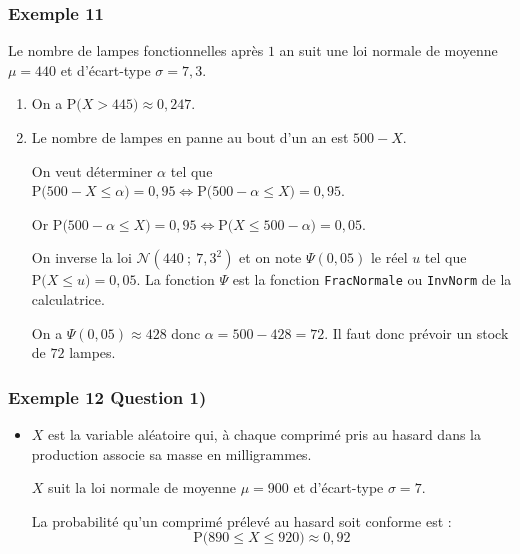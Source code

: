\documentclass[xcolor=svgnames,t,final]{beamer}
\newcommand{\loinorm}[2]{\mathcal{N}\left(#1\ ; \ #2 \right)}
\newcommand{\proba}[1]{\text{P}\big(#1\big)}
\begin{document}
\begin{frame}

\frametitle{Exemple 11}

\label{exemple11}
Le nombre de lampes fonctionnelles après $1$ an suit une loi normale de moyenne $\mu=440$ et d'écart-type  $\sigma = 7,3$.

\begin{enumerate}
\item  On a $\proba{X>445} \approx 0,247$.

\item Le nombre de lampes en panne au bout d'un an est $500 - X$.

On veut déterminer  $\alpha$ tel que $\proba{500 - X \leqslant \alpha} = 0,95 \Leftrightarrow \proba{500 - \alpha \leqslant X} = 0,95  $. 

Or $\proba{500 - \alpha \leqslant X} = 0,95 \Leftrightarrow \proba{X \leqslant 500 - \alpha} = 0,05$.

On inverse la loi $\loinorm{440}{7,3^2}$ et on note $\Psi(0,05)$ le réel $u$ tel que $\proba{X \leqslant u} = 0,05$.
La fonction $\Psi$ est la fonction \texttt{FracNormale} ou \texttt{InvNorm} de la calculatrice.

On a $\Psi(0,05) \approx 428$ donc $\alpha = 500 - 428 = 72$. Il faut donc prévoir un stock de $72$ lampes.

\end{enumerate}

\end{frame}



\begin{frame}

\frametitle{Exemple 12 Question 1)}
\label{exemple12}

\begin{itemize}

	\item $X$ est la variable aléatoire qui, à chaque comprimé pris au hasard dans la production associe sa masse en milligrammes.
	
	$X$ suit la loi normale de moyenne $\mu= 900$ et d'écart-type $\sigma = 7$.
	
	La probabilité qu'un comprimé prélevé au hasard soit conforme est :
	\begin{equation*}
	\boxed{\proba{890 \leqslant X \leqslant 920} \approx 0,92}
	\end{equation*}
	

\end{itemize}


\end{frame}
\end{document}
